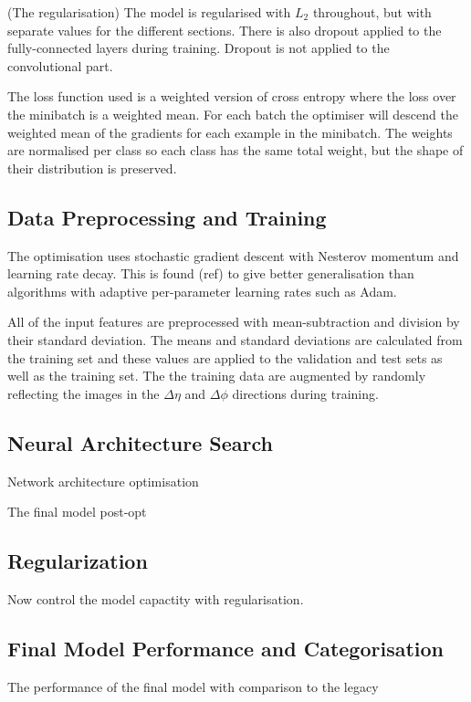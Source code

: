 (The regularisation)
The model is regularised with $L_2$ throughout, but with separate values for the different sections. There is also dropout applied to the fully-connected layers during training. 
Dropout is not applied to the convolutional part. 



The loss function used is a weighted version of cross entropy where the loss over the minibatch is a weighted mean. For each batch the optimiser will descend the weighted mean of the gradients for each example in the minibatch. The weights are normalised per class so each class has the same total weight, but the shape of their distribution is preserved.  


\subsection{Data Preprocessing and Training}
The optimisation uses stochastic gradient descent with Nesterov momentum and learning rate decay. This is found (ref) to give better generalisation than algorithms with adaptive per-parameter learning rates such as Adam. 

All of the input features are preprocessed with mean-subtraction and division by their standard deviation. The means and standard deviations are calculated from the training set and these values are applied to the validation and test sets as well as the training set. 
The the training data are augmented by randomly reflecting the images in the $\Delta\eta$ and $\Delta\phi$ directions during training. 



\subsection{Neural Architecture Search}
Network architecture optimisation

The final model post-opt 



\subsection{Regularization}
Now control the model capactity with regularisation. 


\subsection{Final Model Performance and Categorisation}
The performance of the final model with comparison to the legacy


